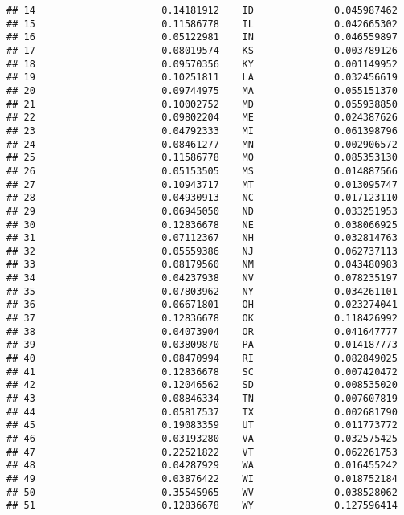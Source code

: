 \documentclass{article}\usepackage[]{graphicx}\usepackage[]{color}
\makeatletter
\newenvironment{kframe}{%
 \def\at@end@of@kframe{}%
 \ifinner\ifhmode%
  \def\at@end@of@kframe{\end{minipage}}%
  \begin{minipage}{\columnwidth}%
 \fi\fi%
 \def\FrameCommand##1{\hskip\@totalleftmargin \hskip-\fboxsep
 \colorbox{shadecolor}{##1}\hskip-\fboxsep
     \hskip-\linewidth \hskip-\@totalleftmargin \hskip\columnwidth}%
 \MakeFramed {\advance\hsize-\width
   \@totalleftmargin\z@ \linewidth\hsize
   \@setminipage}}%
 {\par\unskip\endMakeFramed%
 \at@end@of@kframe}
\newenvironment{knitrout}{}{} %
\makeatother
\begin{document}
\begin{knitrout}
\begin{kframe}
\begin{verbatim}
## 14                      0.14181912    ID              0.045987462
## 15                      0.11586778    IL              0.042665302
## 16                      0.05122981    IN              0.046559897
## 17                      0.08019574    KS              0.003789126
## 18                      0.09570356    KY              0.001149952
## 19                      0.10251811    LA              0.032456619
## 20                      0.09744975    MA              0.055151370
## 21                      0.10002752    MD              0.055938850
## 22                      0.09802204    ME              0.024387626
## 23                      0.04792333    MI              0.061398796
## 24                      0.08461277    MN              0.002906572
## 25                      0.11586778    MO              0.085353130
## 26                      0.05153505    MS              0.014887566
## 27                      0.10943717    MT              0.013095747
## 28                      0.04930913    NC              0.017123110
## 29                      0.06945050    ND              0.033251953
## 30                      0.12836678    NE              0.038066925
## 31                      0.07112367    NH              0.032814763
## 32                      0.05559386    NJ              0.062737113
## 33                      0.08179560    NM              0.043480983
## 34                      0.04237938    NV              0.078235197
## 35                      0.07803962    NY              0.034261101
## 36                      0.06671801    OH              0.023274041
## 37                      0.12836678    OK              0.118426992
## 38                      0.04073904    OR              0.041647777
## 39                      0.03809870    PA              0.014187773
## 40                      0.08470994    RI              0.082849025
## 41                      0.12836678    SC              0.007420472
## 42                      0.12046562    SD              0.008535020
## 43                      0.08846334    TN              0.007607819
## 44                      0.05817537    TX              0.002681790
## 45                      0.19083359    UT              0.011773772
## 46                      0.03193280    VA              0.032575425
## 47                      0.22521822    VT              0.062261753
## 48                      0.04287929    WA              0.016455242
## 49                      0.03876422    WI              0.018752184
## 50                      0.35545965    WV              0.038528062
## 51                      0.12836678    WY              0.127596414

\end{verbatim}
\end{kframe}
\end{knitrout}
\end{document}
